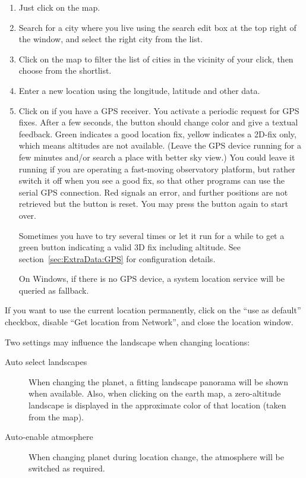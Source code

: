 \begin{enumerate}
\item Just click on the map.
\item Search for a city where you live using the search edit box at
  the top right of the window, and select the right city from the
  list.
\item Click on the map to filter the list of cities in the vicinity of
  your click, then choose from the shortlist.
\item Enter a new location using the longitude, latitude and other
  data.
\item Click on  if you have a GPS
  receiver. You activate a periodic request
  for GPS fixes. After a few seconds, the button should change color
  and give a textual feedback. Green indicates a good location fix, yellow
  indicates a 2D-fix only, which means altitudes are not
  available. (Leave the GPS device running for a few minutes and/or
  search a place with better sky view.) You could leave it running if
  you are operating a fast-moving observatory platform, but rather
  switch it off when you see a good fix, so that other programs can
  use the serial GPS connection.  Red signals an error, and further
  positions are not retrieved but the button is reset. You may press
  the button again to start over.

  Sometimes you have to try several times or let it run for a while to get a
  green button indicating a valid 3D fix including altitude.
  See section~\ref{sec:ExtraData:GPS} for configuration details.
  
  On Windows, if there is no GPS device, a system location service will be queried as fallback.
\end{enumerate}

\noindent If you want to use the current location permanently, click on the
``use as default'' checkbox, disable ``Get location from Network'',
and close the location window.

Two settings may influence the landscape when changing locations:
\begin{description}
\item[Auto select landscapes] When changing the planet, 
a fitting landscape panorama will be shown when available. 
Also,  when clicking on the earth map, 
a zero-altitude landscape is displayed in the approximate color of that location (taken from the map).
\item[Auto-enable atmosphere] When changing planet during
  location change, the atmosphere will be switched as required.
\end{description}

